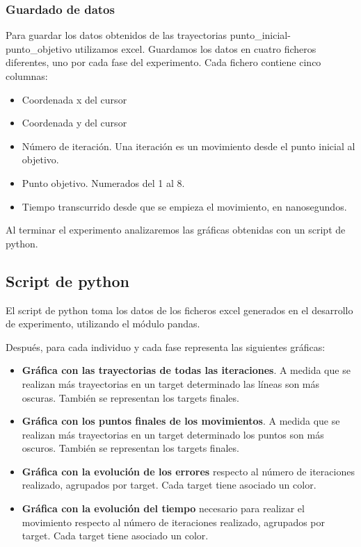 \documentclass[a4paper,11pt, oneside]{book}
\begin{document}
\subsubsection{Guardado de datos}

Para guardar los datos obtenidos de las trayectorias punto\_inicial-punto\_objetivo utilizamos excel. Guardamos los datos en cuatro ficheros diferentes, uno por cada fase del experimento. Cada fichero contiene cinco columnas:
\begin{itemize}
	\item Coordenada x del cursor
	\item Coordenada y del cursor
	\item Número de iteración. Una iteración es un movimiento desde el punto inicial al objetivo.
	\item Punto objetivo. Numerados del 1 al 8.
	\item Tiempo transcurrido desde que se empieza el movimiento, en nanosegundos.
\end{itemize}

Al terminar el experimento analizaremos las gráficas obtenidas con un script de python.

\subsection{Script de python}

El script de python toma los datos de los ficheros excel generados en el desarrollo de experimento, utilizando el módulo pandas.

Después, para cada individuo y cada fase representa las siguientes gráficas:

\begin{itemize}
	\item \textbf{Gráfica con las trayectorias de todas las iteraciones}. A medida que se realizan más trayectorias en un target determinado las líneas son más oscuras. También se representan los targets finales.
	\item \textbf{Gráfica con los puntos finales de los movimientos}. A medida que se realizan más trayectorias en un target determinado los puntos son más oscuros. También se representan los targets finales.
	\item \textbf{Gráfica con la evolución de los errores} respecto al número de iteraciones realizado, agrupados por target. Cada target tiene asociado un color.
	\item \textbf{Gráfica con la evolución del tiempo} necesario para realizar el movimiento respecto al número de iteraciones realizado, agrupados por target. Cada target tiene asociado un color.
\end{itemize}
\end{document}
